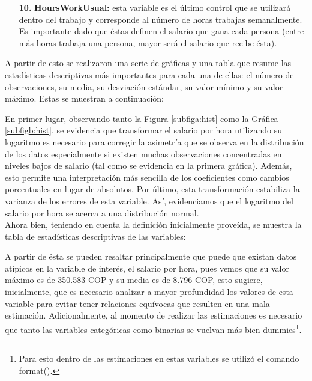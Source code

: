 \documentclass[12pt]{article}
\begin{document}
\begin{enumerate}
    
    \item [\textbf{10.}] \textbf{HoursWorkUsual:} esta variable es el último control que se utilizará dentro del trabajo y corresponde al número de horas trabajas semanalmente. Es importante dado que éstas definen el salario que gana cada persona (entre más horas trabaja una persona, mayor será el salario que recibe ésta).
    
\end{enumerate}

A partir de esto se realizaron una serie de gráficas y una tabla que resume las estadísticas descriptivas más importantes para cada una de ellas: el número de observaciones, su media, su desviación estándar, su valor mínimo y su valor máximo. Estas se muestran a continuación:



En primer lugar, observando tanto la Figura \ref{subfiga:hist} como la Gráfica \ref{subfigb:hist}, se evidencia que transformar el salario por hora utilizando su logaritmo es necesario para corregir la asimetría que se observa en la distribución de los datos especialmente si existen muchas observaciones concentradas en niveles bajos de salario (tal como se evidencia en la primera gráfica). Además, esto permite una interpretación más sencilla de los coeficientes como cambios porcentuales en lugar de absolutos. Por último, esta transformación estabiliza la varianza de los errores de esta variable. Así, evidenciamos que el logaritmo del salario por hora se acerca a una distribución normal. \\

Ahora bien, teniendo en cuenta la definición inicialmente proveída, se muestra la tabla de estadísticas descriptivas de las variables:



A partir de ésta se pueden resaltar principalmente que puede que existan datos atípicos en la variable de interés, el salario por hora, pues vemos que su valor máximo es de 350.583 COP y su media es de 8.796 COP, esto sugiere, inicialmente, que es necesario analizar a mayor profundidad los valores de esta variable para evitar tener relaciones equívocas que resulten en una mala estimación. Adicionalmente, al momento de realizar las estimaciones es necesario que tanto las variables categóricas como binarias se vuelvan más bien dummies\footnote{Para esto dentro de las estimaciones en estas variables se utilizó el comando format().}. 
\end{document}

